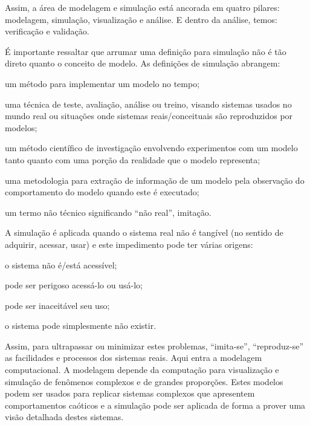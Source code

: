 \documentclass[a4paper,12pt,oneside,onecolumn]{uerj/uerj}
\begin{document}
Assim, a área de modelagem e simulação está ancorada em quatro pilares: modelagem, simulação, visualização e análise. E dentro da análise, temos: verificação e validação.

É importante ressaltar que arrumar uma definição para simulação não é tão direto quanto o conceito de modelo. As definições de simulação abrangem:

\begin{lcircp}
    \item um método para implementar um modelo no tempo;
    \item uma técnica de teste, avaliação, análise ou treino, visando sistemas usados no mundo real ou situações onde sistemas reais/conceituais são reproduzidos por modelos;
    \item um método científico de investigação envolvendo experimentos com um modelo tanto quanto com uma porção da realidade que o modelo representa;
    \item uma metodologia para extração de informação de um modelo pela observação do comportamento do modelo quando este é executado;
    \item um termo não técnico significando ``não real'', imitação.\\
\end{lcircp}

A simulação é aplicada quando o sistema real não é tangível (no sentido de adquirir, acessar, usar) e este impedimento pode ter várias origens:

\begin{lcircp}
    \item o sistema não é/está acessível;
    \item pode ser perigoso acessá-lo ou usá-lo;
    \item pode ser inaceitável seu uso;
    \item o sistema pode simplesmente não existir.\\
\end{lcircp}

Assim, para ultrapassar ou minimizar estes problemas, ``imita-se'', ``reproduz-se'' as facilidades e processos dos sistemas reais. Aqui entra a modelagem computacional. A modelagem depende da computação para visualização e simulação de fenômenos complexos e de grandes proporções. Estes modelos podem ser usados para replicar sistemas complexos que apresentem comportamentos caóticos e a simulação pode ser aplicada de forma a prover uma visão detalhada destes sistemas.
\end{document}
